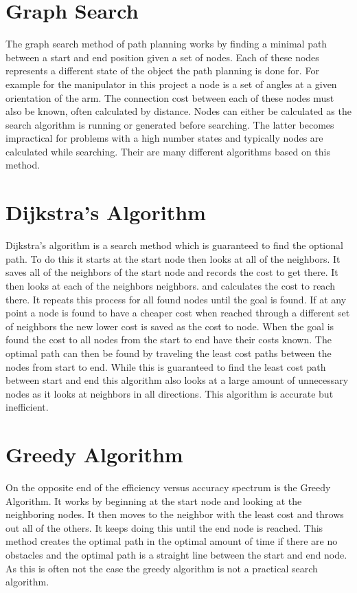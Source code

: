 \documentclass[letterpaper,12pt]{report}
\begin{document}
\section{Graph Search}
The graph search method of path planning works by finding a minimal path between a start and end position given a set of nodes. Each of these nodes represents a different state of the object the path planning is done for. For example for the manipulator in this project a node is a set of angles at a given orientation of the arm. The connection cost between each of these nodes must also be known, often calculated by distance. Nodes can either be calculated as the search algorithm is running or generated before searching. The latter becomes impractical for problems with a high number states and typically nodes are calculated while searching. Their are many different algorithms based on this method.

\section{Dijkstra's Algorithm}
Dijkstra's algorithm is a search method which is guaranteed to find the optional path. To do this it starts at the start node then looks at all of the neighbors. It saves all of the neighbors of the start node and records the cost to get there. It then looks at each of the neighbors neighbors. and calculates the cost to reach there. It repeats this process for all found nodes until the goal is found. If at any point a node is found to have a cheaper cost when reached through a different set of neighbors the new lower cost is saved as the cost to node. When the goal is found the cost to all nodes from the start to end have their costs known. The optimal path can then be found by traveling the least cost paths between the nodes from start to end. While this is guaranteed to find the least cost path between start and end this algorithm also looks at a large amount of unnecessary nodes as it looks at neighbors in all directions. This algorithm is accurate but inefficient. 

\section{Greedy Algorithm}
On the opposite end of the efficiency versus accuracy spectrum is the Greedy Algorithm. It works by beginning at the start node and looking at the neighboring nodes. It then moves to the neighbor with the least cost and throws out all of the others. It keeps doing this until the end node is reached. This method creates the optimal path in the optimal amount of time if there are no obstacles and the optimal path is a straight line between the start and end node.  As this is often not the case the greedy algorithm is not a practical search algorithm.
\end{document}
